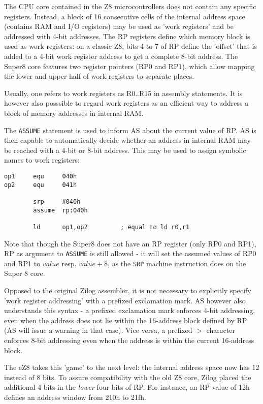 \documentclass[12pt,twoside]{report}
\newcommand{\tty}[1]{{\tt #1}}
\begin{document}
The CPU core contained in the Z8 microcontrollers does not
contain any specific registers.  Instead, a block of 16
consecutive cells of the internal address space (contains RAM and
I/O registers) may be used as 'work registers' and be addressed
with 4-bit addresses.  The RP registers define which memory block
is used as work registers: on a classic Z8, bits 4 to 7 of RP
define the 'offset' that is added to a 4-bit work register
address to get a complete 8-bit address.  The Super8 core
features two register pointers (RP0 and RP1), which allow mapping
the lower and upper half of work registers to separate places.

Usually, one refers to work registers as R0..R15 in assembly
statements.  It is however also posssible to regard work registers as
an efficient way to address a block of memory addresses in internal
RAM.

The \tty{ASSUME} statement is used to inform AS about the current
value of RP. AS is then capable to automatically decide whether an
address in internal RAM may be reached with a 4-bit or 8-bit address.
This may be used to assign symbolic names to work registers:
\begin{verbatim}
op1     equ     040h
op2     equ     041h

        srp     #040h
        assume  rp:040h

        ld      op1,op2         ; equal to ld r0,r1
\end{verbatim}
Note that though the Super8 does not have an RP register (only
RP0 and RP1), RP as argument to \tty{ASSUME} is still allowed -
it will set the assumed values of RP0 and RP1 to $value$ resp.
$value+8$, as the \tty{SRP} machine instruction does on the Super
8 core.

Opposed to the original Zilog assembler, it is not necessary to
explicitly specify 'work register addressing' with a prefixed
exclamation mark.  AS however also understands this syntax - a
prefixed exclamation mark enforces 4-bit addressing, even when the
address does not lie within the 16-address block defined by RP (AS will
issue a warning in that case).  Vice versa, a prefixed $>$
character enforces 8-bit addressing even when the address is within
the current 16-address block.

The eZ8 takes this 'game' to the next level: the internal address
space now has 12 instead of 8 bits.  To assure compatibility with the
old Z8 core, Zilog placed the additional 4 bits in the {\em lower}
four bits of RP.  For instance, an RP value of 12h defines an address
window from 210h to 21fh.
\end{document}
